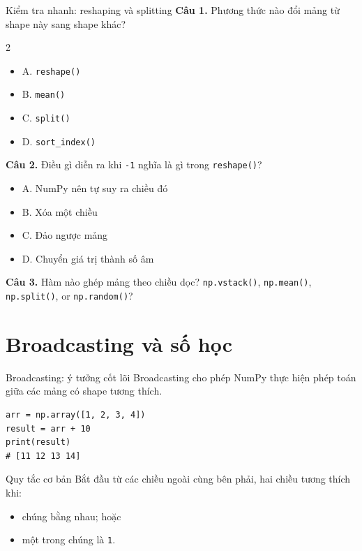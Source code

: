 \documentclass[aspectratio=169,11pt]{beamer}
\newcommand{\quiztitle}[1]{\textbf{\textcolor{QuizOrange}{#1}}}
\begin{document}
\begin{frame}{Kiểm tra nhanh: reshaping và splitting}
\small
\quiztitle{Câu 1.} Phương thức nào đổi mảng từ shape này sang shape khác?
\begin{multicols}{2}
\begin{itemize}
  \item A. \texttt{reshape()}
  \item B. \texttt{mean()}
  \item C. \texttt{split()}
  \item D. \texttt{sort\_index()}
\end{itemize}
\end{multicols}
\quiztitle{Câu 2.} Điều gì diễn ra khi \texttt{-1} nghĩa là gì trong \texttt{reshape()}?
\begin{itemize}
  \item A. NumPy nên tự suy ra chiều đó
  \item B. Xóa một chiều
  \item C. Đảo ngược mảng
  \item D. Chuyển giá trị thành số âm
\end{itemize}
\quiztitle{Câu 3.} Hàm nào ghép mảng theo chiều dọc? \texttt{np.vstack()}, \texttt{np.mean()}, \texttt{np.split()}, or \texttt{np.random()}?
\end{frame}

\section{Broadcasting và số học}

\begin{frame}[fragile]{Broadcasting: ý tưởng cốt lõi}
\small
Broadcasting cho phép NumPy thực hiện phép toán giữa các mảng có shape tương thích.
\begin{lstlisting}[style=py]
arr = np.array([1, 2, 3, 4])
result = arr + 10
print(result)
# [11 12 13 14]
\end{lstlisting}
\begin{block}{Quy tắc cơ bản}
Bắt đầu từ các chiều ngoài cùng bên phải, hai chiều tương thích khi:
\begin{itemize}
  \item chúng bằng nhau; hoặc
  \item một trong chúng là \texttt{1}.
\end{itemize}
\end{block}
\end{frame}
\end{document}
